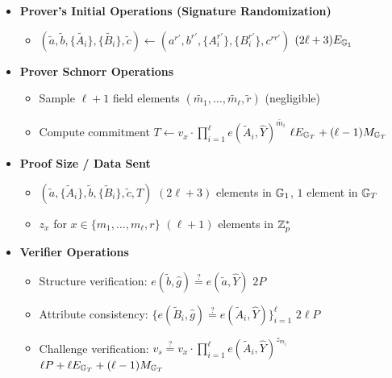 {\begin{itemize}
    \item \textbf{Prover's Initial Operations (Signature Randomization)}
    \begin{itemize}
        \item $(\tilde{a}, \tilde{b}, \{\tilde{A_i}\}, \{\tilde{B_i}\}, \tilde{c}) \gets (a^{r'}, b^{r'}, \{A_i^{r'}\}, \{B_i^{r'}\}, c^{rr'})$ \qquad $(2\ell + 3)E_{\mathbb{G}_1}$
    \end{itemize}
    
    \item \textbf{Prover Schnorr Operations}
    \begin{itemize}
        \item Sample $\ell+1$ field elements $(\tilde{m_1},\ldots,\tilde{m_\ell}, \tilde{r})$ \qquad (negligible)
        \item Compute commitment $T \gets v_x \cdot \prod_{i=1}^\ell e(\tilde{A}_i, \widehat{Y})^{\tilde{m_i}}$ \qquad $\ell E_{\mathbb{G}_T} + (\ell-1)M_{\mathbb{G}_T}$
    \end{itemize}
    
    \item \textbf{Proof Size / Data Sent}
    \begin{itemize}
        \item $(\tilde{a}, \{\tilde{A}_i\}, \tilde{b}, \{\tilde{B}_i\}, \tilde{c}, T)$ \qquad $(2\ell + 3)$ elements in $\mathbb{G}_1$, $1$ element in $\mathbb{G}_T$
        \item $z_x$ for $x \in \{m_1,\ldots,m_\ell, r\}$ \qquad $(\ell + 1)$ elements in $\mathbb{Z}_p^*$
    \end{itemize}
    
    \item \textbf{Verifier Operations}
    \begin{itemize}
        \item Structure verification: $e(\tilde{b}, \hat{g}) \stackrel{?}{=} e(\tilde{a}, \widehat{Y})$ \qquad $2P$
        \item Attribute consistency: $\{e(\tilde{B}_i, \hat{g}) \stackrel{?}{=} e(\tilde{A}_i, \widehat{Y})\}_{i=1}^\ell$ \qquad $2\ell P$
        \item Challenge verification: $v_s \stackrel{?}{=} v_x \cdot \prod_{i=1}^\ell e(\tilde{A}_i, \widehat{Y})^{z_{m_i}}$ \qquad $\ell P + \ell E_{\mathbb{G}_T} + (\ell-1)M_{\mathbb{G}_T}$
    \end{itemize}
\end{itemize}



% 
% 



}
